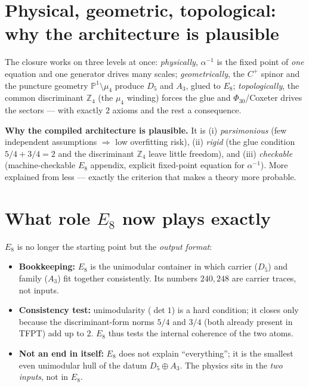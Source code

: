 \documentclass[11pt,a4paper]{article}
\newcommand{\ainv}{\alpha^{-1}}
\newcommand{\Z}{\mathbb{Z}}
\newcommand{\PP}{\mathbb{P}}
\begin{document}
\section{Physical, geometric, topological: why the architecture is plausible}
The closure works on three levels at once: \emph{physically}, $\ainv$ is the fixed point of \emph{one}
equation and one generator drives many scales; \emph{geometrically}, the $C^+$ spinor and the puncture
geometry $\PP^1\!\setminus\!\mu_4$ produce $D_5$ and $A_3$, glued to $E_8$; \emph{topologically}, the
common discriminant $\Z_4$ (the $\mu_4$ winding) forces the glue and $\Phi_{30}$/Coxeter drives the
sectors --- with exactly $2$ axioms and the rest a consequence.

\noindent\textbf{Why the compiled architecture is plausible.}
It is (i) \emph{parsimonious} (few independent assumptions $\Rightarrow$ low overfitting risk),
(ii) \emph{rigid} (the glue condition $5/4+3/4=2$ and the discriminant $\Z_4$ leave little freedom),
and (iii) \emph{checkable} (machine-checkable $E_8$ appendix, explicit fixed-point equation for
$\ainv$). More explained from less --- exactly the criterion that makes a theory more probable.

\section{What role $E_8$ now plays exactly}
$E_8$ is no longer the starting point but the \emph{output format}:
\begin{itemize}[leftmargin=1.4em]
\item \textbf{Bookkeeping:} $E_8$ is the unimodular container in which carrier ($D_5$) and family ($A_3$)
      fit together consistently. Its numbers $240,248$ are carrier traces, not inputs.
\item \textbf{Consistency test:} unimodularity ($\det 1$) is a hard condition; it closes only because the
      discriminant-form norms $5/4$ and $3/4$ (both already present in TFPT) add up to $2$. $E_8$ thus
      tests the internal coherence of the two atoms.
\item \textbf{Not an end in itself:} $E_8$ does not explain ``everything''; it is the smallest even
      unimodular hull of the datum $D_5\oplus A_3$. The physics sits in the \emph{two inputs}, not in
      $E_8$.
\end{itemize}
\end{document}
